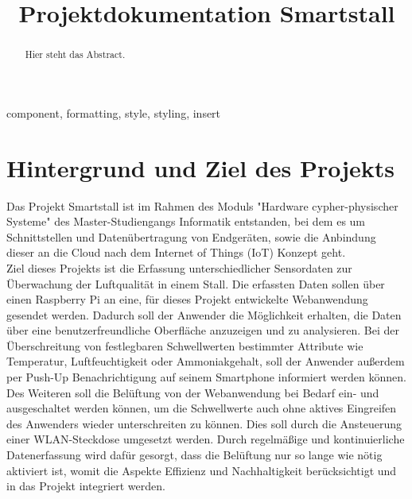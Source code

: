 \documentclass[conference]{IEEEtran}
\begin{document}
\title{Projektdokumentation Smartstall\\
}

\author{
\and
{}
}

\maketitle

\begin{abstract}
Hier steht das Abstract.
\end{abstract}

\begin{IEEEkeywords}
component, formatting, style, styling, insert
\end{IEEEkeywords}

\section{Hintergrund und Ziel des Projekts}
Das Projekt Smartstall ist im Rahmen des Moduls "Hardware cypher-physischer Systeme" des Master-Studiengangs Informatik entstanden, bei dem es um Schnittstellen und Datenübertragung von Endgeräten, sowie die Anbindung dieser an die Cloud nach dem Internet of Things (IoT) Konzept geht. \\
Ziel dieses Projekts ist die Erfassung unterschiedlicher Sensordaten zur Überwachung der Luftqualität in einem Stall. Die erfassten Daten sollen über einen Raspberry Pi an eine, für dieses Projekt entwickelte Webanwendung gesendet werden. Dadurch soll der Anwender die Möglichkeit erhalten, die Daten über eine benutzerfreundliche Oberfläche anzuzeigen und zu analysieren. Bei der Überschreitung von festlegbaren Schwellwerten bestimmter Attribute wie Temperatur, Luftfeuchtigkeit oder Ammoniakgehalt, soll der Anwender außerdem per Push-Up Benachrichtigung auf seinem Smartphone informiert werden können. \\
Des Weiteren soll die Belüftung von der Webanwendung bei Bedarf ein- und ausgeschaltet werden können, um die Schwellwerte auch ohne aktives Eingreifen des Anwenders wieder unterschreiten zu können. Dies soll durch die Ansteuerung einer WLAN-Steckdose umgesetzt werden. Durch regelmäßige und kontinuierliche Datenerfassung wird dafür gesorgt, dass die Belüftung nur so lange wie nötig aktiviert ist, womit die Aspekte Effizienz und Nachhaltigkeit berücksichtigt und in das Projekt integriert werden. 
\end{document}
